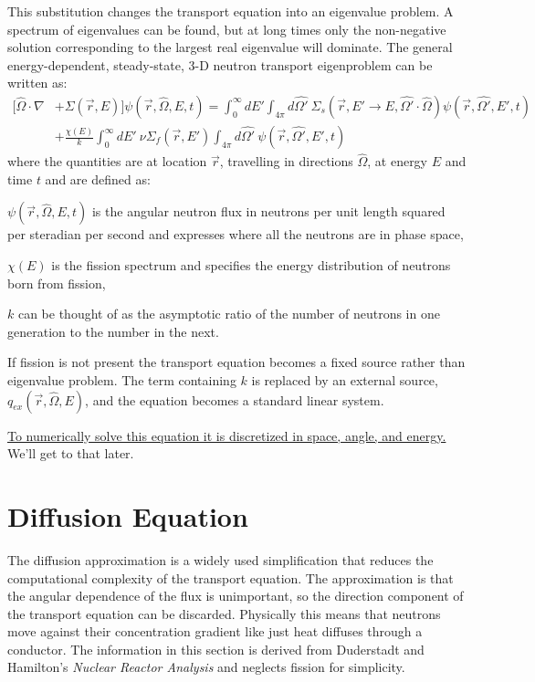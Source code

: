 \documentclass[12pt]{article}
\newcommand{\Macro}{\ensuremath{\Sigma}}
\begin{document}
This substitution changes the transport equation into an eigenvalue problem. A spectrum of eigenvalues can be found, but at long times only the non-negative solution corresponding to the largest real eigenvalue will dominate. The general energy-dependent, steady-state, 3-D neutron transport eigenproblem can be written as:
%
\begin{align}
[\hat{\Omega} \cdot \nabla &+ \Macro(\vec{r}, E)] \psi(\vec{r}, \hat{\Omega}, E, t)  =  \int_0^{\infty} dE' \int_{4\pi} d\hat{\Omega'} \:\Macro_{s}(\vec{r}, E' \to E, \hat{\Omega'} \cdot \hat{\Omega}) \psi(\vec{r}, \hat{\Omega'}, E', t) \nonumber \\
&+\frac{ \chi(E)}{k} \int_0^{\infty} dE' \:\nu \Macro_{f}(\vec{r}, E') \int_{4\pi} d\hat{\Omega'} \:\psi(\vec{r}, \hat{\Omega'}, E', t) \nonumber
\end{align}
%
\noindent where the quantities are at location $\vec{r}$, travelling in directions $\hat{\Omega}$, at energy $E$ and time $t$ and are defined as:
\begin{list}{}{\hspace{2em}}
  \item $\psi(\vec{r}, \hat{\Omega}, E, t)$ is the angular neutron flux in neutrons per unit length squared per steradian per second and expresses where all the neutrons are in phase space, 
  \item $\chi(E)$ is the fission spectrum and specifies the energy distribution of neutrons born from fission,
  \item $k$ can be thought of as the asymptotic ratio of the number of neutrons in one generation to the number in the next.
\end{list}

If fission is not present the transport equation becomes a fixed source rather than eigenvalue problem. The term containing $k$ is replaced by an external source, $q_{ex}(\vec{r}, \hat{\Omega}, E)$, and the equation becomes a standard linear system. 

\underline{To numerically solve this equation it is discretized in space, angle, and energy.} We'll get to that later.

\section{Diffusion Equation}

The diffusion approximation is a widely used simplification that reduces the computational complexity of the transport equation. The approximation is that the angular dependence of the flux is unimportant, so the direction component of the transport equation can be discarded. Physically this means that neutrons move against their concentration gradient like just heat diffuses through a conductor. The information in this section is derived from Duderstadt and Hamilton's \emph{Nuclear Reactor Analysis} and neglects fission for simplicity. 
\end{document}

